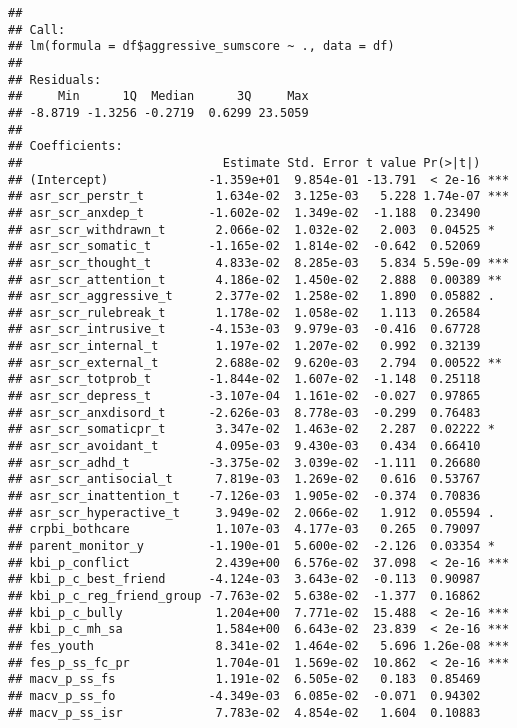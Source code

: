 \documentclass[]{article}
\begin{document}
\begin{verbatim}
## 
## Call:
## lm(formula = df$aggressive_sumscore ~ ., data = df)
## 
## Residuals:
##     Min      1Q  Median      3Q     Max 
## -8.8719 -1.3256 -0.2719  0.6299 23.5059 
## 
## Coefficients:
##                            Estimate Std. Error t value Pr(>|t|)    
## (Intercept)              -1.359e+01  9.854e-01 -13.791  < 2e-16 ***
## asr_scr_perstr_t          1.634e-02  3.125e-03   5.228 1.74e-07 ***
## asr_scr_anxdep_t         -1.602e-02  1.349e-02  -1.188  0.23490    
## asr_scr_withdrawn_t       2.066e-02  1.032e-02   2.003  0.04525 *  
## asr_scr_somatic_t        -1.165e-02  1.814e-02  -0.642  0.52069    
## asr_scr_thought_t         4.833e-02  8.285e-03   5.834 5.59e-09 ***
## asr_scr_attention_t       4.186e-02  1.450e-02   2.888  0.00389 ** 
## asr_scr_aggressive_t      2.377e-02  1.258e-02   1.890  0.05882 .  
## asr_scr_rulebreak_t       1.178e-02  1.058e-02   1.113  0.26584    
## asr_scr_intrusive_t      -4.153e-03  9.979e-03  -0.416  0.67728    
## asr_scr_internal_t        1.197e-02  1.207e-02   0.992  0.32139    
## asr_scr_external_t        2.688e-02  9.620e-03   2.794  0.00522 ** 
## asr_scr_totprob_t        -1.844e-02  1.607e-02  -1.148  0.25118    
## asr_scr_depress_t        -3.107e-04  1.161e-02  -0.027  0.97865    
## asr_scr_anxdisord_t      -2.626e-03  8.778e-03  -0.299  0.76483    
## asr_scr_somaticpr_t       3.347e-02  1.463e-02   2.287  0.02222 *  
## asr_scr_avoidant_t        4.095e-03  9.430e-03   0.434  0.66410    
## asr_scr_adhd_t           -3.375e-02  3.039e-02  -1.111  0.26680    
## asr_scr_antisocial_t      7.819e-03  1.269e-02   0.616  0.53767    
## asr_scr_inattention_t    -7.126e-03  1.905e-02  -0.374  0.70836    
## asr_scr_hyperactive_t     3.949e-02  2.066e-02   1.912  0.05594 .  
## crpbi_bothcare            1.107e-03  4.177e-03   0.265  0.79097    
## parent_monitor_y         -1.190e-01  5.600e-02  -2.126  0.03354 *  
## kbi_p_conflict            2.439e+00  6.576e-02  37.098  < 2e-16 ***
## kbi_p_c_best_friend      -4.124e-03  3.643e-02  -0.113  0.90987    
## kbi_p_c_reg_friend_group -7.763e-02  5.638e-02  -1.377  0.16862    
## kbi_p_c_bully             1.204e+00  7.771e-02  15.488  < 2e-16 ***
## kbi_p_c_mh_sa             1.584e+00  6.643e-02  23.839  < 2e-16 ***
## fes_youth                 8.341e-02  1.464e-02   5.696 1.26e-08 ***
## fes_p_ss_fc_pr            1.704e-01  1.569e-02  10.862  < 2e-16 ***
## macv_p_ss_fs              1.191e-02  6.505e-02   0.183  0.85469    
## macv_p_ss_fo             -4.349e-03  6.085e-02  -0.071  0.94302    
## macv_p_ss_isr             7.783e-02  4.854e-02   1.604  0.10883    

\end{verbatim}
\end{document}
